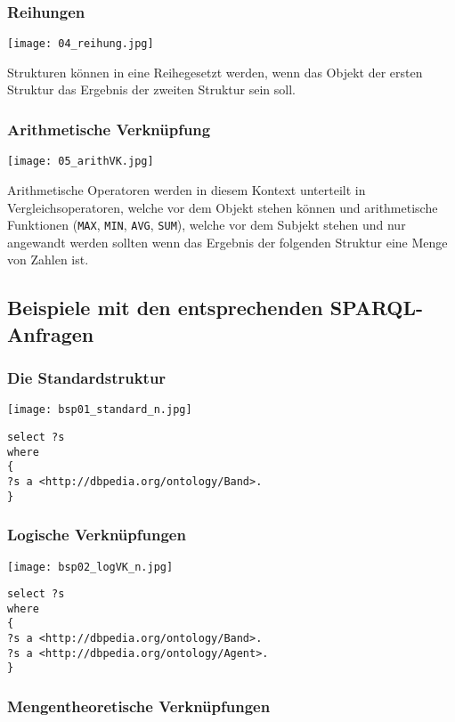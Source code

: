 \subsubsection*{Reihungen}
\texttt{[image: 04\_reihung.jpg]}


Strukturen können \glqq in eine Reihe\grqq gesetzt werden, wenn das Objekt der ersten Struktur das Ergebnis der zweiten Struktur sein soll.

\subsubsection*{Arithmetische Verknüpfung}
\texttt{[image: 05\_arithVK.jpg]}

Arithmetische Operatoren werden in diesem Kontext unterteilt in Vergleichsoperatoren, welche vor dem Objekt stehen können und arithmetische Funktionen (\verb+MAX+, \verb+MIN+, \verb+AVG+, \verb+SUM+), welche vor dem Subjekt stehen und nur angewandt werden sollten wenn das Ergebnis der folgenden Struktur eine Menge von Zahlen ist.

\subsection*{Beispiele mit den entsprechenden SPARQL-Anfragen}

\subsubsection*{Die Standardstruktur}

\texttt{[image: bsp01\_standard\_n.jpg]}

\begin{verbatim}
select ?s
where
{
?s a <http://dbpedia.org/ontology/Band>.
}
\end{verbatim}

\subsubsection*{Logische Verknüpfungen}

\texttt{[image: bsp02\_logVK\_n.jpg]}

\begin{verbatim}
select ?s
where
{
?s a <http://dbpedia.org/ontology/Band>.
?s a <http://dbpedia.org/ontology/Agent>.
}
\end{verbatim}

\subsubsection*{Mengentheoretische Verknüpfungen}

